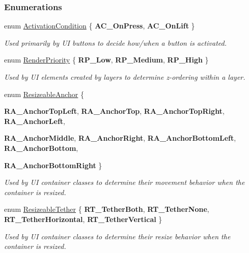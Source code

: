 \subsubsection*{Enumerations}
\begin{DoxyCompactItemize}
\item 
enum \hyperlink{namespaceMezzanine_1_1UI_aca58497951b1b9c7da10f214da3392f0}{ActivationCondition} \{ {\bfseries AC\_\-OnPress}, 
{\bfseries AC\_\-OnLift}
 \}
\begin{DoxyCompactList}\small\item\em Used primarily by UI buttons to decide how/when a button is activated. \item\end{DoxyCompactList}\item 
enum \hyperlink{namespaceMezzanine_1_1UI_ac4c753eb6b5d66350a243acc9ce54130}{RenderPriority} \{ {\bfseries RP\_\-Low}, 
{\bfseries RP\_\-Medium}, 
{\bfseries RP\_\-High}
 \}
\begin{DoxyCompactList}\small\item\em Used by UI elements created by layers to determine z-\/ordering within a layer. \item\end{DoxyCompactList}\item 
enum \hyperlink{namespaceMezzanine_1_1UI_a1c571649db3aa98f4e16285b5b754928}{ResizeableAnchor} \{ \par
{\bfseries RA\_\-AnchorTopLeft}, 
{\bfseries RA\_\-AnchorTop}, 
{\bfseries RA\_\-AnchorTopRight}, 
{\bfseries RA\_\-AnchorLeft}, 
\par
{\bfseries RA\_\-AnchorMiddle}, 
{\bfseries RA\_\-AnchorRight}, 
{\bfseries RA\_\-AnchorBottomLeft}, 
{\bfseries RA\_\-AnchorBottom}, 
\par
{\bfseries RA\_\-AnchorBottomRight}
 \}
\begin{DoxyCompactList}\small\item\em Used by UI container classes to determine their movement behavior when the container is resized. \item\end{DoxyCompactList}\item 
enum \hyperlink{namespaceMezzanine_1_1UI_a0334e290e4c9f6a5468fbe11164a17b9}{ResizeableTether} \{ {\bfseries RT\_\-TetherBoth}, 
{\bfseries RT\_\-TetherNone}, 
{\bfseries RT\_\-TetherHorizontal}, 
{\bfseries RT\_\-TetherVertical}
 \}
\begin{DoxyCompactList}\small\item\em Used by UI container classes to determine their resize behavior when the container is resized. \item\end{DoxyCompactList}\item 

\end{DoxyCompactItemize}

